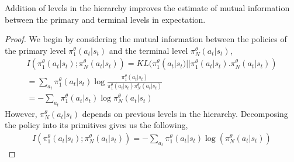 \documentclass{article}
\begin{document}
\begin{prop}{5}\label{five}
    Addition of levels in the hierarchy improves the estimate of mutual information between the primary and terminal levels in expectation.
\end{prop}
\begin{proof}
    We begin by considering the mutual information between the policies of the primary level $\pi^{\theta}_{1}(a_{t}|s_{t})$ and the terminal level $\pi^{\theta}_{N}(a_{t}|s_{t})$,
    \begin{gather}
        I(\pi^{\theta}_{1}(a_{t}|s_{t});\pi^{\theta}_{N}(a_{t}|s_{t})) = KL(\pi^{\theta}_{1}(a_{t}|s_{t})||\pi^{\theta}_{1}(a_{t}|s_{t}).\pi^{\theta}_{N}(a_{t}|s_{t})) \nonumber \\
        = \sum_{a_{t}}\pi^{\theta}_{1}(a_{t}|s_{t})\log\frac{\pi^{\theta}_{1}(a_{t}|s_{t})}{\pi^{\theta}_{1}(a_{t}|s_{t})\pi^{\theta}_{N}(a_{t}|s_{t})} \nonumber \\
        = - \sum_{a_{t}}\pi^{\theta}_{1}(a_{t}|s_{t})\log\pi^{\theta}_{N}(a_{t}|s_{t}) \nonumber
    \end{gather}
    However, $\pi^{\theta}_{N}(a_{t}|s_{t})$ depends on previous levels in the hierarchy. Decomposing the policy into its primitives gives us the following,
    \begin{gather}
    I(\pi^{\theta}_{1}(a_{t}|s_{t});\pi^{\theta}_{N}(a_{t}|s_{t})) = - \sum_{a_{t}} \pi^{\theta}_{1}(a_{t}|s_{t}) \log(\pi^{\theta}_{N}(a_{t}|s_{t}))
    \end{gather}
\end{proof}
\end{document}
